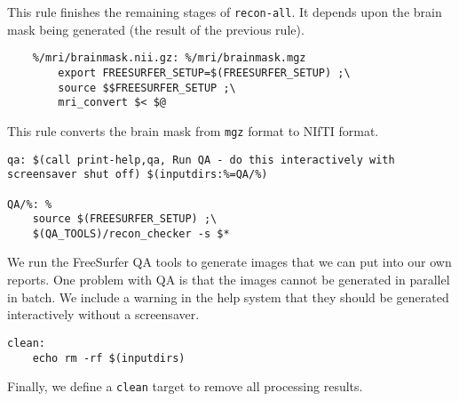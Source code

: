 This rule finishes the remaining stages of
\texttt{recon-all}. It depends upon the brain mask being generated
(the result of the previous rule).

\begin{lstlisting}
	%/mri/brainmask.nii.gz: %/mri/brainmask.mgz
		export FREESURFER_SETUP=$(FREESURFER_SETUP) ;\
		source $$FREESURFER_SETUP ;\
		mri_convert $< $@
\end{lstlisting}
This rule converts the brain mask from \texttt{mgz} format to NIfTI format.

\begin{lstlisting}
qa: $(call print-help,qa, Run QA - do this interactively with screensaver shut off) $(inputdirs:%=QA/%)

QA/%: %
	source $(FREESURFER_SETUP) ;\
	$(QA_TOOLS)/recon_checker -s $*
\end{lstlisting}

We run the FreeSurfer QA tools to generate images that we can put into
our own reports. One problem with QA is that the images cannot be
generated in parallel in batch. We include a warning in the help
system that they should be generated interactively without a
screensaver. 

\begin{lstlisting}
clean:
	echo rm -rf $(inputdirs)
\end{lstlisting}

Finally, we define a \texttt{clean} target to remove all processing
results. 
